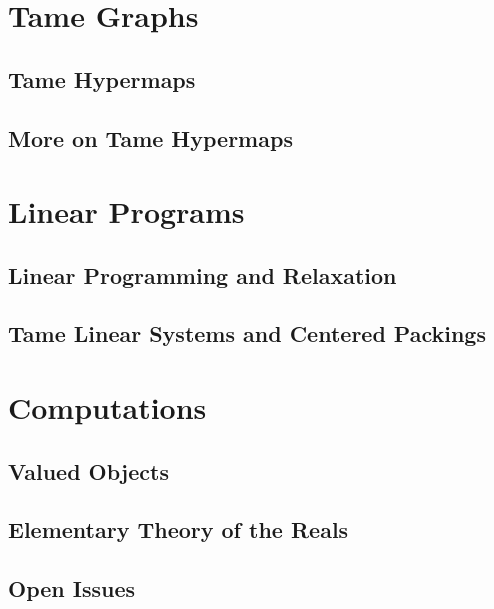 \documentclass[onecolumn]{newsiambook}
\begin{document}
    \part{Tame Graphs}
    \label{part:tame}
    \chapter{Tame Hypermaps}
    
    \chapter{More on Tame Hypermaps}
    


    \part{Linear Programs}
    \label{part:lp}
    \label{part:lprelax}
    \chapter{Linear Programming and Relaxation}
    
    \chapter{Tame Linear Systems and Centered Packings}
    



    \part{Computations}
    \label{part:appendix}
    \chapter{Valued Objects}
    
    
    \chapter{Elementary Theory of the Reals}
     
    \chapter{Open Issues} %
    
\end{document}
